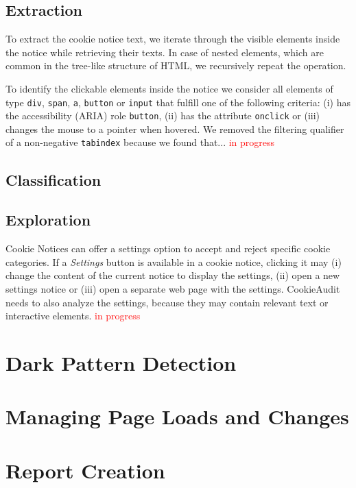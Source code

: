 \subsection{Extraction}
To extract the cookie notice text, we iterate through the visible elements inside the notice while retrieving their texts. 
In case of nested elements, which are common in the tree-like structure of HTML, we recursively repeat the operation.

To identify the clickable elements inside the notice we consider all elements of type \verb|div|, \verb|span|, \verb|a|, \verb|button| or \verb|input| that fulfill one of the following criteria: 
(i) has the accessibility (ARIA) role \verb|button|, 
(ii) has the attribute \verb|onclick| or 
(iii) changes the mouse to a pointer when hovered.
We removed the filtering qualifier of a non-negative \verb|tabindex| because we found that...
\textcolor{red}{in progress}

\subsection{Classification}


\subsection{Exploration}
Cookie Notices can offer a settings option to accept and reject specific cookie categories.
If a \emph{Settings} button is available in a cookie notice, clicking it may (i) change the content of the current notice to display the settings, (ii) open a new settings notice or (iii) open a separate web page with the settings.
CookieAudit needs to also analyze the settings, because they may contain relevant text or interactive elements. 
\textcolor{red}{in progress}

\section{Dark Pattern Detection}
\section{Managing Page Loads and Changes}
\section{Report Creation}